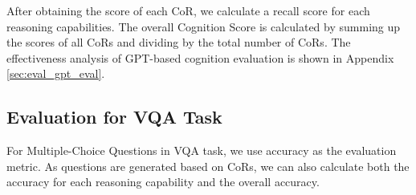 
After obtaining the score of each CoR, we calculate a recall score for each reasoning capabilities.
The overall Cognition Score is calculated by summing up the scores of all CoRs and dividing by the total number of CoRs.
The effectiveness analysis of GPT-based cognition evaluation is shown in Appendix \ref{sec:eval_gpt_eval}.





\subsection{Evaluation for VQA Task}

For Multiple-Choice Questions in VQA task, we use accuracy as the evaluation metric. 
As questions are generated based on CoRs, we can also calculate both the accuracy for each reasoning capability and the overall accuracy.
